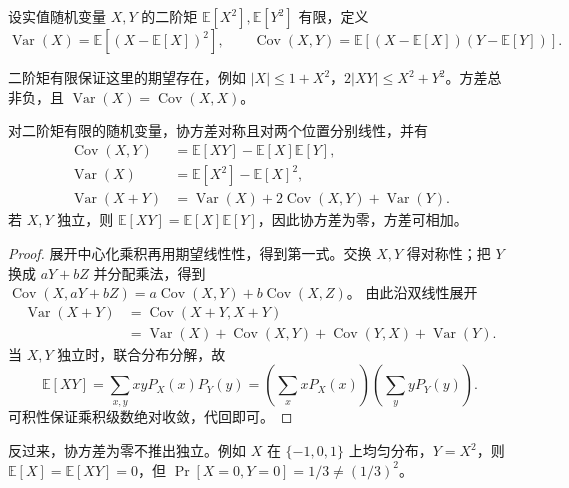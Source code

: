 \documentclass[lang=cn,a4paper,fontset=none,zihao=false,10pt,openany,twoside]{beautybook}
\numberwithin{algorithm}{chapter}
\begin{document}
\begin{definition}[方差与协方差]\label{def:variance-covariance}
设实值随机变量 $X,Y$ 的二阶矩 $\mathbb E[X^2],\mathbb E[Y^2]$ 有限，定义
\[
 \operatorname{Var}(X)=\mathbb E[(X-\mathbb E[X])^2],\qquad
 \operatorname{Cov}(X,Y)=\mathbb E[(X-\mathbb E[X])(Y-\mathbb E[Y])].
\]
\end{definition}
二阶矩有限保证这里的期望存在，例如 $|X|\le1+X^2$，$2|XY|\le X^2+Y^2$。方差总非负，且 $\operatorname{Var}(X)=\operatorname{Cov}(X,X)$。

\begin{proposition}[协方差的运算与独立性]\label{prop:covariance-rules}
对二阶矩有限的随机变量，协方差对称且对两个位置分别线性，并有
\begin{align*}
 \operatorname{Cov}(X,Y)&=\mathbb E[XY]-\mathbb E[X]\mathbb E[Y],\\
 \operatorname{Var}(X)&=\mathbb E[X^2]-\mathbb E[X]^2,\\
 \operatorname{Var}(X+Y)&=\operatorname{Var}(X)+2\operatorname{Cov}(X,Y)+\operatorname{Var}(Y).
\end{align*}
若 $X,Y$ 独立，则 $\mathbb E[XY]=\mathbb E[X]\mathbb E[Y]$，因此协方差为零，方差可相加。
\end{proposition}
\begin{proof}
展开中心化乘积再用期望线性性，得到第一式。交换 $X,Y$ 得对称性；把 $Y$ 换成 $aY+bZ$ 并分配乘法，得到
$\operatorname{Cov}(X,aY+bZ)=a\operatorname{Cov}(X,Y)+b\operatorname{Cov}(X,Z)$。
由此沿双线性展开
\begin{align*}
 \operatorname{Var}(X+Y)&=\operatorname{Cov}(X+Y,X+Y)\\
 &=\operatorname{Var}(X)+\operatorname{Cov}(X,Y)+\operatorname{Cov}(Y,X)+\operatorname{Var}(Y).
\end{align*}
当 $X,Y$ 独立时，联合分布分解，故
\[
 \mathbb E[XY]=\sum_{x,y}xyP_X(x)P_Y(y)
 =\left(\sum_xxP_X(x)\right)\left(\sum_yyP_Y(y)\right).
\]
可积性保证乘积级数绝对收敛，代回即可。
\end{proof}
反过来，协方差为零不推出独立。例如 $X$ 在 $\{-1,0,1\}$ 上均匀分布，$Y=X^2$，则 $\mathbb E[X]=\mathbb E[XY]=0$，但 $\Pr[X=0,Y=0]=1/3\ne(1/3)^2$。
\end{document}

